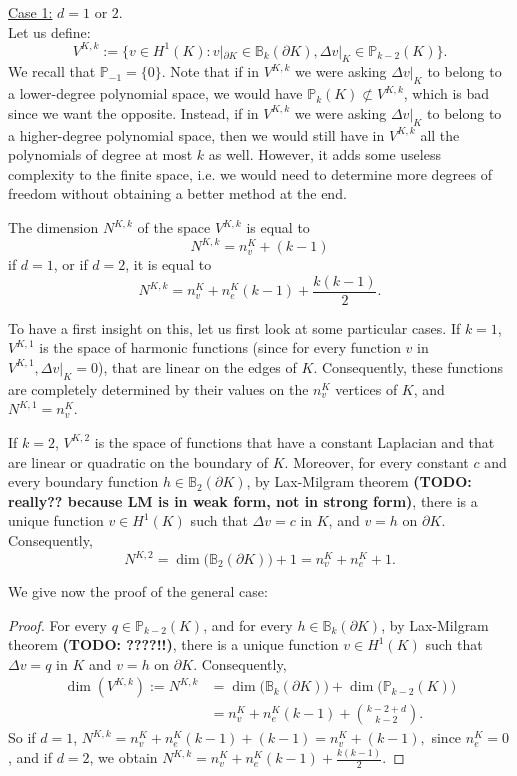 \noindent \underline{Case 1:} $d=1$ or $2$. \\
\noindent Let us define:
$$ V^{K,k} := \Big\{ v\in H^1(K) : v|_{\partial K} \in \mathbb{B}_k(\partial K), \Delta v|_K \in \mathbb{P}_{k-2}(K)\Big\}.$$
We recall that $\mathbb{P}_{-1} = \{0\}$. Note that if in $V^{K,k}$ we were asking $\Delta v|_K$ to belong to a lower-degree polynomial space, we would have $\mathbb{P}_k(K)\not\subset V^{K,k}$, which is bad since we want the opposite. Instead, if in $V^{K,k}$ we were asking $\Delta v|_K$ to belong to a higher-degree polynomial space, then we would still have in $V^{K,k}$ all the polynomials of degree at most $k$ as well. However, it adds some useless complexity to the finite space, i.e. we would need to determine more degrees of freedom without obtaining a better method at the end.

\begin{proposition}
The dimension $N^{K,k}$ of the space $V^{K,k}$ is equal to $$N^{K,k} = n_v^K +(k-1)$$ if $d=1$, or if $d=2$, it is equal to $$N^{K,k} = n_v^K + n_e^K(k-1) + \frac{k(k-1)}{2}.$$
\end{proposition}
To have a first insight on this, let us first look at some particular cases. If $k=1$, $V^{K,1}$ is the space of harmonic functions (since for every function $v$ in $V^{K,1}, \Delta v|_K = 0$), that are linear on the edges of $K$. Consequently, these functions are completely determined by their values on the $n_v^K$ vertices of $K$, and $N^{K,1} = n_v^K$. 

If $k=2$, $V^{K,2}$ is the space of functions that have a constant Laplacian and that are linear or quadratic on the boundary of $K$. Moreover, for every constant $c$ and every boundary function $h\in \mathbb{B}_2(\partial K)$, by Lax-Milgram theorem \textbf{(TODO: really?? because LM is in weak form, not in strong form)}, there is a unique function $v\in H^1(K)$ such that $\Delta v = c$ in $K$, and $v = h$ on $\partial K$. Consequently, $$N^{K,2} = \dim\big(\mathbb{B}_2(\partial K)\big)+1 = n_v^K + n_e^K+1.$$

We give now the proof of the general case:
\begin{proof}
For every $q\in \mathbb{P}_{k-2}(K)$, and for every $h\in \mathbb{B}_k(\partial K)$, by Lax-Milgram theorem \textbf{(TODO: ????!!)}, there is a unique function $v\in H^1(K)$ such that $\Delta v = q$ in $K$ and $v = h$ on $\partial K$. Consequently, 
\begin{align*}\dim\left(V^{K,k}\right) := N^{K,k} &= \dim\big(\mathbb{B}_k\left(\partial K\right)\big)+\dim\big(\mathbb{P}_{k-2}(K)\big)\\
&= n_v^K + n_e^K(k-1) + \binom{k-2+d}{k-2}.
\end{align*}
So if $d=1$, 
$N^{K,k} = n_v^K + n_e^K(k-1) + (k-1) = n_v^K + (k-1),$ since $n_e^K=0$, and if $d=2$, we obtain $N^{K,k} = n_v^K + n_e^K(k-1) + \frac{k(k-1)}{2}.$
\end{proof}

